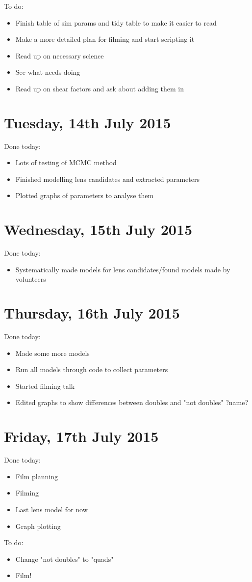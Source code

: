 \documentclass{article}
\begin{document}
\noindent To do:
\begin{itemize}
  \item Finish table of sim params and tidy table to make it easier to read
  \item Make a more detailed plan for filming and start scripting it
  \item Read up on necessary science
  \item See what needs doing
  \item Read up on shear factors and ask about adding them in
\end{itemize}\newpage

\section{Tuesday, 14th July 2015}
\noindent Done today:
\begin{itemize}
  \item Lots of testing of MCMC method
  \item Finished modelling lens candidates and extracted parameters
  \item Plotted graphs of parameters to analyse them
\end{itemize}

\section{Wednesday, 15th July 2015}
\noindent Done today:
\begin{itemize}
  \item Systematically made models for lens candidates/found models made by volunteers
\end{itemize}

\section{Thursday, 16th July 2015}
\noindent Done today:
\begin{itemize}
  \item Made some more models
  \item Run all models through code to collect parameters
  \item Started filming talk
  \item Edited graphs to show differences between doubles and "not doubles" ?name?
\end{itemize}

\section{Friday, 17th July 2015}
\noindent Done today:
\begin{itemize}
  \item Film planning
  \item Filming
  \item Last lens model for now
  \item Graph plotting
\end{itemize}

\noindent To do:
\begin{itemize}
  \item Change "not doubles" to "quads"
  \item Film!
\end{itemize}
\end{document}
